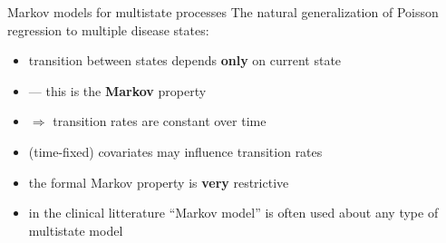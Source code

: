 
\begin{frame}{Markov models for multistate processes}
  The natural generalization of Poisson regression to multiple
    disease states:
  \pause
    \begin{itemize}
    \item transition between states depends \textbf{only} on current state
    \item --- this is the \textbf{Markov} property
    \item $\Rightarrow$ transition rates are constant over time
    \item (time-fixed) covariates may influence transition rates
    \item the formal Markov property is \textbf{very} restrictive
    \item in the clinical litterature ``Markov model'' is often used
      about any type of multistate model
    \end{itemize}
\end{frame}


